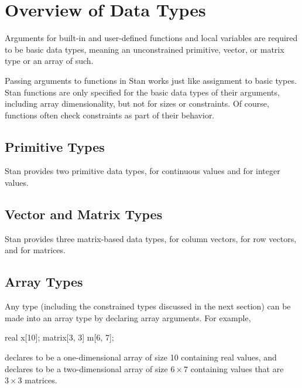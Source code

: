 \section{Overview of Data Types}

Arguments for built-in and user-defined functions and local variables
are required to be basic data types, meaning an unconstrained
primitive, vector, or matrix type or an array of such.

Passing arguments to functions in Stan works just like assignment to
basic types.  Stan functions are only specified for the basic data
types of their arguments, including array dimensionality, but not for
sizes or constraints.  Of course, functions often check constraints as
part of their behavior.

\subsection{Primitive Types}

Stan provides two primitive data types,  for continuous
values and  for integer values.

\subsection{Vector and Matrix Types}
Stan provides three matrix-based data types,  for column
vectors,  for row vectors, and  for
matrices.

\subsection{Array Types}

Any type (including the constrained types discussed in the next
section) can be made into an array type by declaring array arguments.
For example,
%
\begin{stancode}
real x[10];
matrix[3, 3] m[6, 7];
\end{stancode}
%
declares  to be a one-dimensional array of size 10 containing
real values, and declares  to be a two-dimensional array of
size $6 \times 7$ containing values that are $3 \times 3$ matrices.



